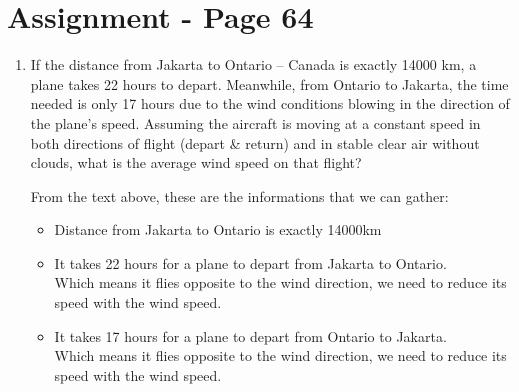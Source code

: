 \documentclass[12pt,titlepage]{article}
\begin{document}
\section{Assignment - Page 64}
\begin{enumerate}
    \item {
        If the distance from Jakarta to Ontario – Canada is exactly 14000 km, a plane takes 22 hours to depart.
        Meanwhile, from Ontario to Jakarta, the time needed is only 17 hours due to the wind conditions blowing in the
        direction of the plane's speed. Assuming the aircraft is moving at a constant speed in both directions of flight
        (depart \& return) and in stable clear air without clouds, what is the average wind speed on that flight?

        From the text above, these are the informations that we can gather:
        \begin{itemize}
            \item Distance from Jakarta to Ontario is exactly 14000km
            \item {
                It takes 22 hours for a plane to depart from Jakarta to Ontario.\\
                Which means it flies opposite to the wind direction, we need to reduce its speed with the wind speed.
            }
            \item {
                It takes 17 hours for a plane to depart from Ontario to Jakarta.\\
                Which means it flies opposite to the wind direction, we need to reduce its speed with the wind speed.
            }
        \end{itemize}

}
\end{enumerate}
\end{document}
